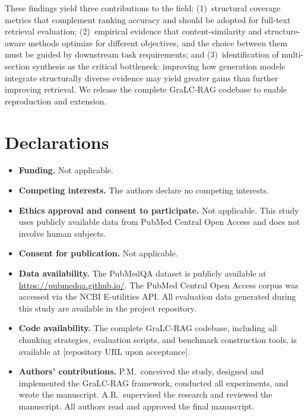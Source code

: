 \documentclass[sn-basic]{sn-jnl}
\newcommand{\gralcrag}{GraLC-RAG}
\begin{document}
These findings yield three contributions to the field: (1)~structural coverage metrics that complement ranking accuracy and should be adopted for full-text retrieval evaluation; (2)~empirical evidence that content-similarity and structure-aware methods optimize for different objectives, and the choice between them must be guided by downstream task requirements; and (3)~identification of multi-section synthesis as the critical bottleneck: improving how generation models integrate structurally diverse evidence may yield greater gains than further improving retrieval. We release the complete \gralcrag{} codebase to enable reproduction and extension.

\backmatter

\section*{Declarations}

\begin{itemize}
\item \textbf{Funding.} Not applicable.
\item \textbf{Competing interests.} The authors declare no competing interests.
\item \textbf{Ethics approval and consent to participate.} Not applicable. This study uses publicly available data from PubMed Central Open Access and does not involve human subjects.
\item \textbf{Consent for publication.} Not applicable.
\item \textbf{Data availability.} The PubMedQA dataset is publicly available at \url{https://pubmedqa.github.io/}. The PubMed Central Open Access corpus was accessed via the NCBI E-utilities API. All evaluation data generated during this study are available in the project repository.
\item \textbf{Code availability.} The complete \gralcrag{} codebase, including all chunking strategies, evaluation scripts, and benchmark construction tools, is available at [repository URL upon acceptance].
\item \textbf{Authors' contributions.} P.M.\ conceived the study, designed and implemented the \gralcrag{} framework, conducted all experiments, and wrote the manuscript. A.R.\ supervised the research and reviewed the manuscript. All authors read and approved the final manuscript.
\end{itemize}


\end{document}
